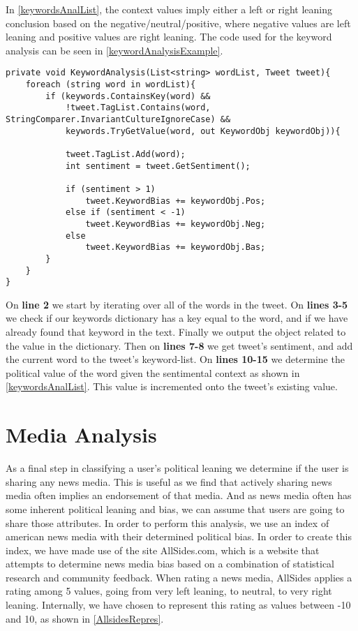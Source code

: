 In \autoref{keywordsAnalList}, the context values imply either a left or
right leaning conclusion based on the negative/neutral/positive, where negative
values are left leaning and positive values are right leaning. The code used for
the keyword analysis can be seen in \autoref{keywordAnalysisExample}.\\

\begin{minipage}[H]{\linewidth}
\begin{lstlisting}[caption = Method for handling the keyword analysis, label = keywordAnalysisExample] 
private void KeywordAnalysis(List<string> wordList, Tweet tweet){
	foreach (string word in wordList){
    	if (keywords.ContainsKey(word) && 
            !tweet.TagList.Contains(word, StringComparer.InvariantCultureIgnoreCase) && 
            keywords.TryGetValue(word, out KeywordObj keywordObj)){
                        
        	tweet.TagList.Add(word);
            int sentiment = tweet.GetSentiment();

            if (sentiment > 1)
            	tweet.KeywordBias += keywordObj.Pos;
            else if (sentiment < -1)
            	tweet.KeywordBias += keywordObj.Neg;
            else
            	tweet.KeywordBias += keywordObj.Bas;
		}
	}
}
\end{lstlisting}
\end{minipage}

On \textbf{line 2} we start by iterating over all of the words in the tweet. On
\textbf{lines 3-5} we check if our keywords dictionary has a key equal to the
word, and if we have already found that keyword in the text. Finally we output
the  object related to the value in the dictionary. Then on
\textbf{lines 7-8} we get tweet's sentiment, and  add the current word to the
tweet's keyword-list. On \textbf{lines 10-15} we determine the political value
of the word given the sentimental context as shown in
\autoref{keywordsAnalList}. This value is incremented onto the tweet's existing
 value.

\section{Media Analysis}
As a final step in classifying a user's political leaning we determine if the
user is sharing any news media. This is useful as we find that actively sharing
news media often implies an endorsement of that media. And as news media often
has some inherent political leaning and bias, we can assume that users are going
to share those attributes. In order to perform this analysis, we use an index of
american news media with their determined political bias. In order to create
this index, we have made use of the site AllSides.com, which is a website that
attempts to determine news media bias based on a combination of statistical
research and community feedback\citep{allSidesMedia}. When rating a news
media, AllSides applies a rating among 5 values, going from very left
leaning, to neutral, to very right leaning. Internally, we have chosen to
represent this rating as values between -10 and 10, as shown in
\autoref{AllsidesRepres}.\\

